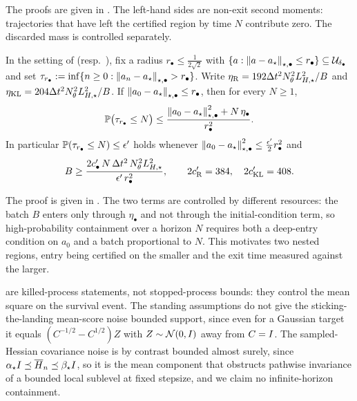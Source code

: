 The proofs are given in . The left-hand sides are non-exit second moments:
trajectories that have left the certified region by time $N$ contribute zero. The discarded mass is
controlled separately.

\begin{proposition}
\label{prop:exit-prob}
In the setting of  (resp.\ ), fix a radius
$r_\bullet\leq\tfrac1{2\sqrt2}$ with
$\{a:\left\lVert a-a_\star\right\rVert_{\star,\bullet}\leq r_\bullet\}\subseteq\mathcal{U}_{\delta_\bullet}$ and set
$\tau_{r_\bullet}:=\inf\{n\geq0:\left\lVert a_n-a_\star\right\rVert_{\star,\bullet}>r_\bullet\}$. Write
$\eta_{\mathrm{R}}=192\Delta t^2N_\theta^2L_{H,\star}^2/B$ and $\eta_{\mathrm{KL}}=204\Delta t^2N_\theta^2L_{H,\star}^2/B$. If
$\left\lVert a_0-a_\star\right\rVert_{\star,\bullet}\leq r_\bullet$, then for every $N\geq1$,
\[
    \mathbb{P}\bigl(\tau_{r_\bullet}\leq N\bigr)
    \leq\frac{\left\lVert a_0-a_\star\right\rVert_{\star,\bullet}^2+N\,\eta_\bullet}{r_\bullet^2}.
\]
In particular $\mathbb{P}(\tau_{r_\bullet}\leq N)\leq\epsilon'$ holds whenever
$\left\lVert a_0-a_\star\right\rVert_{\star,\bullet}^2\leq\tfrac{\epsilon'}2r_\bullet^2$ and
\[
    B\geq\frac{2c'_\bullet\,N\,\Delta t^2\,N_\theta^2L_{H,\star}^2}{\epsilon'\,r_\bullet^2},
    \qquad 2c'_{\mathrm{R}}=384,\quad 2c'_{\mathrm{KL}}=408 .
\]
\end{proposition}

The proof is given in . The two terms are controlled by different resources:
the batch $B$ enters only through $\eta_\bullet$ and not through the initial-condition term, so
high-probability containment over a horizon $N$ requires both a deep-entry condition on $a_0$ and a
batch proportional to $N$. This motivates two nested regions, entry being certified on the smaller and
the exit time measured against the larger.

 are killed-process statements, not stopped-process bounds:
they control the mean square on the survival event. The standing assumptions do not give the
sticking-the-landing mean-score noise bounded support, since even for a Gaussian target it equals
$(C^{-1/2}-C^{1/2})Z$ with $Z\sim\mathcal{N}(0,I)$ away from $C=I$. The sampled-Hessian covariance noise is
by contrast bounded almost surely, since $\alpha_\star I\preceq\overline H_n\preceq\beta_\star I$, so
it is the mean component that obstructs pathwise invariance of a bounded local sublevel at fixed
stepsize, and we claim no infinite-horizon containment.

